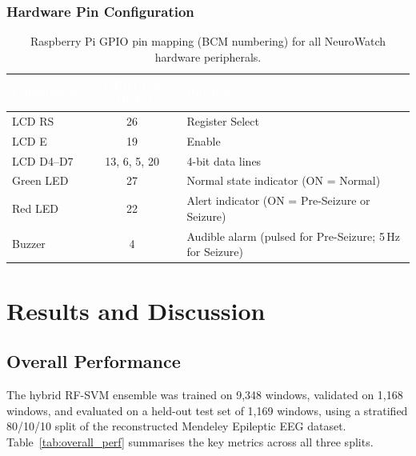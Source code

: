 \documentclass[12pt, a4paper]{report}
\begin{document}
\subsection{Hardware Pin Configuration}

\begin{table}[H]
\centering
\caption{Raspberry Pi GPIO pin mapping (BCM numbering) for all NeuroWatch
         hardware peripherals.}
\label{tab:pinconfig}
\begin{tabular}{|l|c|l|}
\hline
\rowcolor{headerblue}
\textcolor{white}{\textbf{Component}} &
\textcolor{white}{\textbf{GPIO Pin (BCM)}} &
\textcolor{white}{\textbf{Purpose}} \\
\hline
LCD RS       & 26          & Register Select \\
\hline
\rowcolor{lightgray}
LCD E        & 19          & Enable \\
\hline
LCD D4–D7    & 13, 6, 5, 20 & 4-bit data lines \\
\hline
\rowcolor{lightgray}
Green LED    & 27          & Normal state indicator (ON = Normal) \\
\hline
Red LED      & 22          & Alert indicator (ON = Pre-Seizure or Seizure) \\
\hline
\rowcolor{lightgray}
Buzzer       & 4           & Audible alarm (pulsed for Pre-Seizure; 5\,Hz for Seizure) \\
\hline
\end{tabular}
\end{table}

\chapter{Results and Discussion}

\section{Overall Performance}

The hybrid RF-SVM ensemble was trained on 9,348 windows, validated on
1,168 windows, and evaluated on a held-out test set of 1,169 windows,
using a stratified 80/10/10 split of the reconstructed Mendeley Epileptic
EEG dataset. Table~\ref{tab:overall_perf} summarises the key metrics across
all three splits.
\end{document}
